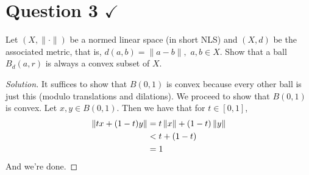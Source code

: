 \section{Question 3 \texorpdfstring{$\checkmark$}{}}
\horz
Let $(X,\|\cdot\|)$ be a normed linear space (in short NLS) and $(X,d)$ be the associated metric, that is, $d(a,b)=\|a-b\|,\,\,a,b\in X.$ Show that a ball $B_d(a,r)$ is always a convex subset of $X.$ 
\horz
\begin{proof}[Solution]
    It suffices to show that $B(0,1)$ is convex because every other ball is just this (modulo translations and dilations).
    We proceed to show that $B(0,1)$ is convex. Let $x,y \in B(0,1)$. Then we have that for $t\in[0,1]$,
    \begin{align*}
	\left\lVert tx+(1-t)y \right\rVert &= t \left\lVert x \right\rVert + (1-t)\left\lVert y \right\rVert \\
	&< t+(1-t) \\
	&= 1
    \end{align*}
    And we're done.
\end{proof}

